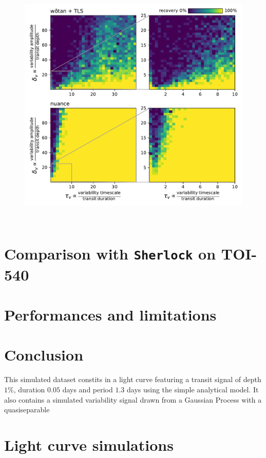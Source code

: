 \documentclass{aastex631}
\begin{document}
\begin{figure}[H]
    \begin{centering}
        \includegraphics[height=12cm]{../../workflows/synthetic_injection_recovery/figures/final_result.pdf}
        \caption{}
        \label{fig:simu}
    \end{centering}
\end{figure}

\section{Comparison with \texttt{Sherlock} on TOI-540}\label{real}

\section{Performances and limitations}\label{perf}

\section{Conclusion}

This simulated dataset constits in a light curve featuring a transit signal of depth $1$\%, duration $0.05$ days and period $1.3$ days using the simple \citealt{protopapas} analytical model. It also contains a simulated variability signal drawn from a Gaussian Process with a quasiseparable 


\appendix
\section{Light curve simulations}\label{app_principle_simulations}

\end{document}
